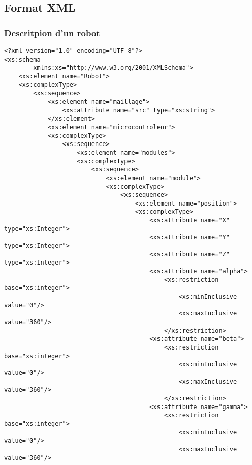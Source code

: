 \subsection{Format XML}
\subsubsection{Descritpion d'un robot}
\begin{changemargin}{-1cm}{-1cm}
\begin{lstlisting}[caption=Description du Robot, label=descbot]
<?xml version="1.0" encoding="UTF-8"?>
<xs:schema
        xmlns:xs="http://www.w3.org/2001/XMLSchema">
    <xs:element name="Robot">
    <xs:complexType>
        <xs:sequence>
            <xs:element name="maillage">
                <xs:attribute name="src" type="xs:string">
            </xs:element>
            <xs:element name="microcontroleur">
            <xs:complexType>
                <xs:sequence>
                    <xs:element name="modules">
                    <xs:complexType>
                        <xs:sequence>
                            <xs:element name="module">
                            <xs:complexType>
                                <xs:sequence>
                                    <xs:element name="position">
                                    <xs:complexType>
                                        <xs:attribute name="X" type="xs:Integer">
                                        <xs:attribute name="Y" type="xs:Integer">
                                        <xs:attribute name="Z" type="xs:Integer">
                                        <xs:attribute name="alpha">
                                            <xs:restriction base="xs:integer">
                                                <xs:minInclusive value="0"/>
                                                <xs:maxInclusive value="360"/>
                                            </xs:restriction> 
                                        <xs:attribute name="beta">
                                            <xs:restriction base="xs:integer">
                                                <xs:minInclusive value="0"/>
                                                <xs:maxInclusive value="360"/>
                                            </xs:restriction>
                                        <xs:attribute name="gamma">
                                            <xs:restriction base="xs:integer">
                                                <xs:minInclusive value="0"/>
                                                <xs:maxInclusive value="360"/>

\end{lstlisting}
\end{changemargin}
